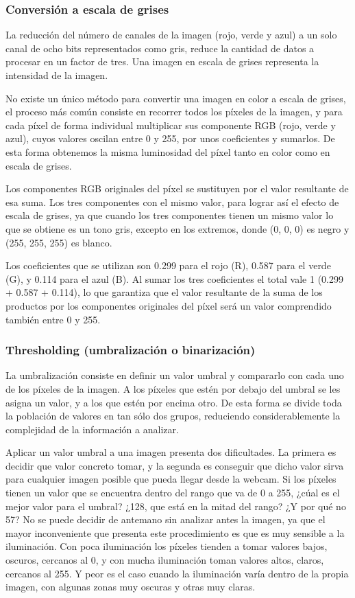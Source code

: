 \subsubsection{Conversión a escala de grises}
La reducción del número de canales de la imagen (rojo, verde y azul) a un solo canal de ocho bits representados como gris, reduce la cantidad de datos a procesar en un factor de tres. Una imagen en escala de grises representa la intensidad de la imagen. 

No existe un único método para convertir una imagen en color a escala de grises, el proceso más común consiste en recorrer todos los píxeles de la imagen, y para cada píxel de forma individual multiplicar sus componente RGB (rojo, verde y azul), cuyos valores oscilan entre 0 y 255, por unos coeficientes y sumarlos. De esta forma obtenemos la misma luminosidad del píxel tanto en color como en escala de grises.

Los componentes RGB originales del píxel se sustituyen por el valor resultante de esa suma. Los tres componentes con el mismo valor, para lograr así el efecto de escala de grises, ya que cuando los tres componentes tienen un mismo valor lo que se obtiene es un tono gris, excepto en los extremos, donde (0, 0, 0) es negro y (255, 255, 255) es blanco.

Los coeficientes que se utilizan son 0.299 para el rojo (R), 0.587 para el verde (G), y 0.114 para el azul (B). Al sumar los tres coeficientes el total vale 1 (0.299 + 0.587 + 0.114), lo que garantiza que el valor resultante de la suma de los productos por los componentes originales del píxel será un valor comprendido también entre 0 y 255.

\subsubsection{Thresholding (umbralización o binarización)}
La umbralización consiste en definir un valor umbral y compararlo con cada uno de los píxeles de la imagen. A los píxeles que estén por debajo del umbral se les asigna un valor, y a los que estén por encima otro. De esta forma se divide toda la población de valores en tan sólo dos grupos, reduciendo considerablemente la complejidad de la información a analizar.

Aplicar un valor umbral a una imagen presenta dos dificultades. La primera es decidir que valor concreto tomar, y la segunda es conseguir que dicho valor sirva para cualquier imagen posible que pueda llegar desde la webcam. Si los píxeles tienen un valor que se encuentra dentro del rango que va de 0 a 255, ¿cúal es el mejor valor para el umbral? ¿128, que está en la mitad del rango? ¿Y por qué no 57? No se puede decidir de antemano sin analizar antes la imagen, ya que el mayor inconveniente que presenta este procedimiento es que es muy sensible a la iluminación. Con poca iluminación los píxeles tienden a tomar valores bajos, oscuros, cercanos al 0, y con mucha iluminación toman valores altos, claros, cercanos al 255. Y peor es el caso cuando la iluminación varía dentro de la propia imagen, con algunas zonas muy oscuras y otras muy claras.

